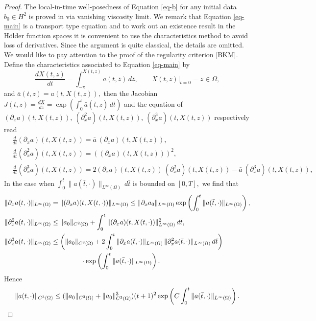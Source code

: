 \documentclass[12pt]{amsart}
\numberwithin{equation}{section}
\numberwithin{equation}{section}
\begin{document}
 \begin{proof}
 The local-in-time well-posedness of Equation \eqref{eq-b} for any initial data $b_0\in H^2$ is proved in \cite{CCGO} via vanishing viscosity limit.    
  We remark that  Equation  \eqref{eq-main} is a transport type equation and to work out an existence   result   in the H\"older function spaces it is    convenient to use the characteristics method to avoid loss of derivatives.    Since the argument is quite classical,  the details are omitted. 
We would like to pay attention to the proof of the regularity criterion  \eqref{BKM}.  Define the characteristics associated to Equation \eqref{eq-main} by
 \begin{equation*} 
\frac{d X(t, z)}{dt}=\int_{-\pi}^{X(t, z)} a(t,  \bar z)\,d\bar z,\qquad X(t, z)|_{t=0}=z\in \Omega,
\end{equation*}
and  $\bar{a}(t, z)=a(t, X(t, z)),$  then the Jacobian $J(t, z)=\frac{d X}{dz}=\exp(\int_0^t\bar{a}(\bar t, z)\,d\bar{t})$ and
the equation of $(\partial_x a)(t, X(t, z)),~(\partial^2_x a)(t, X(t, z)),~(\partial^3_x a)(t, X(t, z))$ respectively read
\begin{align*}
& \frac{d  }{dt} (\partial_x a)(t, X(t, z))=\bar{a} ~(\partial_x a)(t, X(t, z)),\\
 & \frac{d  }{dt} (\partial^2_x a)(t, X(t, z))= \left((\partial_x a)(t, X(t, z))\right)^2,\\
  &\frac{d  }{dt} (\partial^3_x a)(t, X(t, z))=2  (\partial_x a)(t, X(t, z))~ (\partial^2_x a)(t, X(t, z))-\bar{a} ~(\partial^3_x a)(t, X(t, z)),
\end{align*}
In the case when $\int_0^t \|a(\bar t, \cdot)\|_{L^\infty(\Omega)}\,d\bar{t}$ is bounded on $[0, T],$ we find that
\begin{align*}
&\|\partial_x a(t, \cdot)\|_{L^\infty(\Omega)}=\|(\partial_x a)(t, X(t, \cdot))\|_{L^\infty(\Omega)}\leq \|\partial_x a_0\|_{L^\infty(\Omega)}\exp\left(\int_0^t \|a(\bar t, \cdot)\|_{L^\infty(\Omega)}\right),\\
&\|\partial^2_x a(t, \cdot)\|_{L^\infty(\Omega)}\leq  \|a_0\|_{ C^2(\Omega)} + \int_0^t \|(\partial_x a)(\bar t, X(t, \cdot))\|_{L^\infty(\Omega)}^2\,d\bar t,\\
&\|\partial^3_x a(t, \cdot)\|_{L^\infty(\Omega)}\leq  \left(\|a_0\|_{ C^3(\Omega)}  + 2\int_0^t \|\partial_x a (\bar t,  \cdot)\|_{L^\infty(\Omega)}  \,\|\partial^2_x a (\bar t,  \cdot)\|_{L^\infty(\Omega)}   \,d\bar t\right)\\
&\hspace*{4cm}\cdot\exp\left(\int_0^t \|a(\bar t, \cdot)\|_{L^\infty(\Omega)}\right).
\end{align*}
Hence
\begin{equation*}
\|a(t, \cdot)\|_{ C^3(\Omega)} \leq  (\|a_0\|_{ C^3(\Omega)}+\|a_0\|_{ C^3(\Omega)}^3) (t+1)^2\exp\left(C\int_0^t \|a(\bar t, \cdot)\|_{L^\infty(\Omega)}\right).\qedhere
\end{equation*}
 \end{proof}
 
\end{document}
